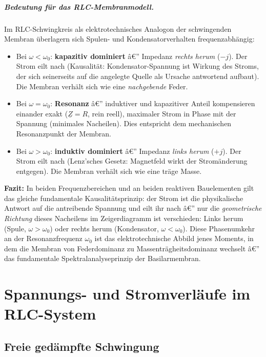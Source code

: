 ﻿\documentclass[12pt,a4paper,titlepage]{report}
\begin{document}
\paragraph{Bedeutung für das RLC-Membranmodell.}
Im RLC-Schwingkreis als elektrotechnisches Analogon der schwingenden Membran
überlagern sich Spulen- und Kondensatorverhalten frequenzabhängig:
\begin{itemize}[leftmargin=2em]
	\item Bei $\omega < \omega_0$: \textbf{kapazitiv dominiert} â€”
		Impedanz \emph{rechts herum} ($-j$).
		Der Strom eilt nach (Kausalität: Kondensator-Spannung ist Wirkung des Stroms,
		der sich seinerseits auf die angelegte Quelle als Ursache antwortend aufbaut).
		Die Membran verhält sich wie eine \emph{nachgebende} Feder.
	\item Bei $\omega = \omega_0$: \textbf{Resonanz} â€”
		induktiver und kapazitiver Anteil kompensieren einander exakt ($\underline{Z} = R$,
		rein reell), maximaler Strom in Phase mit der Spannung (minimales Nacheilen).
		Dies entspricht dem mechanischen Resonanzpunkt der Membran.
	\item Bei $\omega > \omega_0$: \textbf{induktiv dominiert} â€”
		Impedanz \emph{links herum} ($+j$).
		Der Strom eilt nach (Lenz'sches Gesetz: Magnetfeld wirkt der Stromänderung entgegen).
		Die Membran verhält sich wie eine träge Masse.
\end{itemize}

\textbf{Fazit:} In beiden Frequenzbereichen und an beiden reaktiven Bauelementen gilt
das gleiche fundamentale Kausalitätsprinzip: der Strom ist die physikalische Antwort
auf die antreibende Spannung und eilt ihr nach â€” nur die \emph{geometrische Richtung}
dieses Nacheilens im Zeigerdiagramm ist verschieden:
Links herum (Spule, $\omega > \omega_0$) oder rechts herum (Kondensator, $\omega < \omega_0$).
Diese Phasenumkehr an der Resonanzfrequenz $\omega_0$ ist das elektrotechnische Abbild
jenes Moments, in dem die Membran von Federdominanz zu Massenträgheitsdominanz
wechselt â€” das fundamentale Spektralanalyseprinzip der Basilarmembran.

\chapter{Spannungs- und Stromverläufe im RLC-System}

\section{Freie gedämpfte Schwingung}
\end{document}
